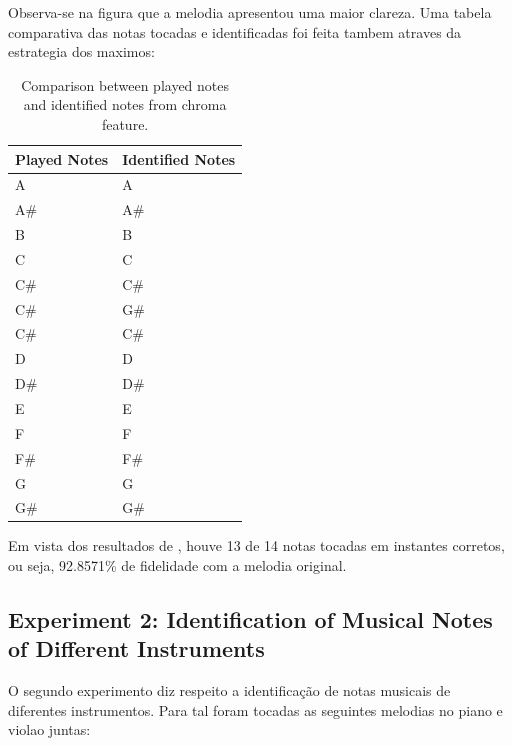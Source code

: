 \documentclass{article}
\begin{document}
	Observa-se na figura  que a melodia apresentou uma maior clareza. Uma tabela comparativa das notas tocadas e identificadas foi feita tambem atraves da estrategia dos maximos:

	\begin{table}[h]
	 \begin{center}
	 \begin{tabular}{|l|l|}
	  \hline
	  Played Notes & Identified Notes \\
	  \hline
	  A  & A \\
	  A\#  & A\# \\
	  B  & B \\
	  C  & C \\
	  C\#  & C\# \\
	  C\#  & G\# \\
	  C\#  & C\# \\
	  D  & D \\
	  D\#  & D\# \\
	  E  & E \\
	  F  & F \\
	  F\#  & F\# \\
	  G  & G \\
	  G\#  & G\# \\
	  \hline
	 \end{tabular}
	\end{center}
	 \caption{Comparison between played notes and identified notes from chroma feature.}
	 \label{tab:table-1-ccm}
	\end{table}

	Em vista dos resultados de , houve 13 de 14 notas tocadas em instantes corretos, ou seja, 92.8571\% de fidelidade com a melodia original.


	\subsection{Experiment 2: Identification of Musical Notes of Different Instruments}

	O segundo experimento diz respeito a identificação de notas musicais de diferentes instrumentos. Para tal foram tocadas as seguintes melodias no piano e violao juntas:
\end{document}
